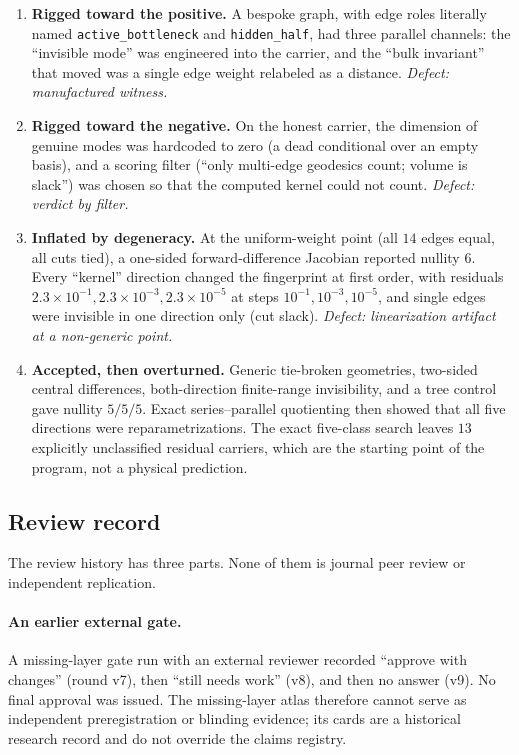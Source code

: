 \begin{enumerate}\tightlist
\item \textbf{Rigged toward the positive.} A bespoke graph, with edge roles literally named
  \texttt{active\_bottleneck} and \texttt{hidden\_half}, had three parallel channels: the ``invisible mode'' was
  engineered into the carrier, and the ``bulk invariant'' that moved was a single edge weight relabeled as a distance.
  \emph{Defect: manufactured witness.}
\item \textbf{Rigged toward the negative.} On the honest carrier, the dimension of genuine modes was hardcoded to zero
  (a dead conditional over an empty basis), and a scoring filter (``only multi-edge geodesics count; volume is slack'')
  was chosen so that the computed kernel could not count. \emph{Defect: verdict by filter.}
\item \textbf{Inflated by degeneracy.} At the uniform-weight point (all \(14\) edges equal, all cuts tied), a one-sided
  forward-difference Jacobian reported nullity \(6\). Every ``kernel'' direction changed the fingerprint at first
  order, with residuals \(2.3\times10^{-1},2.3\times10^{-3},2.3\times10^{-5}\) at steps \(10^{-1},10^{-3},10^{-5}\), and
  single edges were invisible in one direction only (cut slack). \emph{Defect: linearization artifact at a non-generic
  point.}
\item \textbf{Accepted, then overturned.} Generic tie-broken geometries, two-sided central differences, both-direction
  finite-range invisibility, and a tree control gave nullity \(5/5/5\). Exact series--parallel quotienting then showed
  that all five directions were reparametrizations. The exact five-class search leaves \(13\) explicitly unclassified
  residual carriers, which are the starting point of the program, not a physical prediction.
\end{enumerate}

\subsection{Review record}\label{review-record}

The review history has three parts. None of them is journal peer review or independent replication.

\paragraph{An earlier external gate.} A missing-layer gate run with an external reviewer recorded ``approve with
changes'' (round v7), then ``still needs work'' (v8), and then no answer (v9). No final approval was issued. The
missing-layer atlas therefore cannot serve as independent preregistration or blinding evidence; its cards are a
historical research record and do not override the claims registry.

